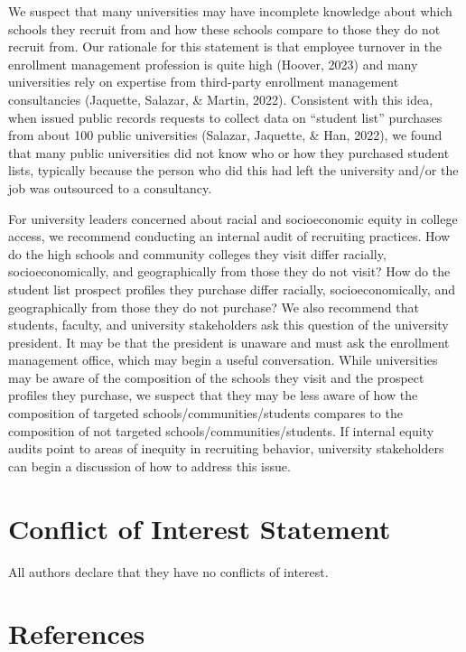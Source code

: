 \documentclass[
  12pt,
]{article}
\begin{document}
We suspect that many universities may have incomplete knowledge about which schools they recruit from and how these schools compare to those they do not recruit from. Our rationale for this statement is that employee turnover in the enrollment management profession is quite high (Hoover, 2023) and many universities rely on expertise from third-party enrollment management consultancies (Jaquette, Salazar, \& Martin, 2022). Consistent with this idea, when issued public records requests to collect data on ``student list'' purchases from about 100 public universities (Salazar, Jaquette, \& Han, 2022), we found that many public universities did not know who or how they purchased student lists, typically because the person who did this had left the university and/or the job was outsourced to a consultancy.

For university leaders concerned about racial and socioeconomic equity in college access, we recommend conducting an internal audit of recruiting practices. How do the high schools and community colleges they visit differ racially, socioeconomically, and geographically from those they do not visit? How do the student list prospect profiles they purchase differ racially, socioeconomically, and geographically from those they do not purchase? We also recommend that students, faculty, and university stakeholders ask this question of the university president. It may be that the president is unaware and must ask the enrollment management office, which may begin a useful conversation. While universities may be aware of the composition of the schools they visit and the prospect profiles they purchase, we suspect that they may be less aware of how the composition of targeted schools/communities/students compares to the composition of not targeted schools/communities/students. If internal equity audits point to areas of inequity in recruiting behavior, university stakeholders can begin a discussion of how to address this issue.

\section{Conflict of Interest Statement}\label{conflict-of-interest-statement}

All authors declare that they have no conflicts of interest.

\singlespacing

\section{References}\label{references}
\end{document}
